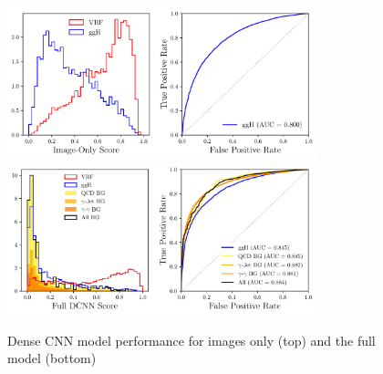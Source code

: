 %
\begin{figure}[h!]
    \begin{center}
    \includegraphics[width=0.8\textwidth]{figures/event_selection/imgonly_DCNN_LPS.pdf}
    \includegraphics[width=0.8\textwidth]{figures/event_selection/full_DCNN_LPS.pdf}
    \end{center}
    \caption{Dense CNN model performance for images only (top) and the full model (bottom)}
    \label{fig:vbf_lps_appendix:image_only_DCNN}
\end{figure}
%
